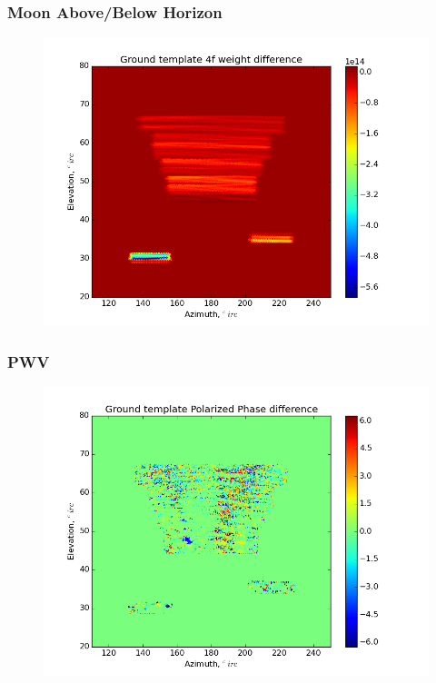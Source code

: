 \documentclass{beamer}
\begin{document}
\begin{frame}
\frametitle{Moon Above/Below Horizon}
\begin{figure}
\includegraphics[width=0.9\linewidth]{dw4_gt_MOON_HORIZON.png}
\end{figure}
\end{frame}

\begin{frame}
\frametitle{PWV}
\begin{figure}
\includegraphics[width=0.9\linewidth]{dArg_gt_PWV.png}
\end{figure}
\end{frame}
\end{document}
